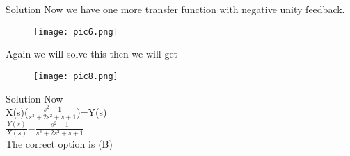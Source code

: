 \documentclass{beamer}
\begin{document}
\begin{frame}{Solution}
Now we have one more transfer function with negative unity feedback.
\begin{figure}
\texttt{[image: pic6.png]}
\end{figure}
Again we will solve this then we will get
\begin{figure}
\texttt{[image: pic8.png]}
\end{figure}
\end{frame}
\begin{frame}{Solution}
Now\\

X(s)($\frac{s^2+1}{s^3+2s^2+s+1}$)=Y(s)\\

$\frac{Y(s)}{X(s)}$=$\frac{s^2+1}{s^3+2s^2+s+1}$\\
 The correct option is (B)
\end{frame}
\end{document}
